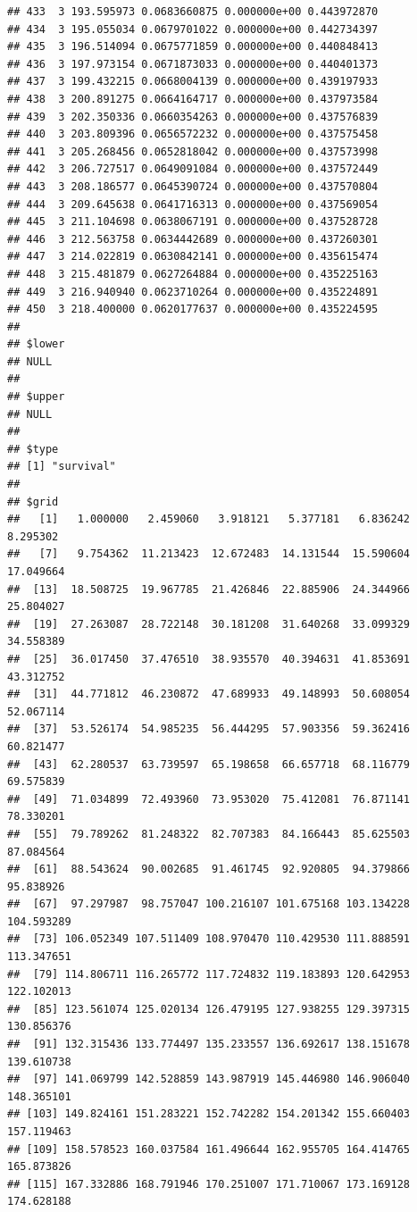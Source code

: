 \documentclass[article]{jss}\usepackage[]{graphicx}\usepackage[]{xcolor}
\makeatletter
\newenvironment{kframe}{%
 \def\at@end@of@kframe{}%
 \ifinner\ifhmode%
  \def\at@end@of@kframe{\end{minipage}}%
  \begin{minipage}{\columnwidth}%
 \fi\fi%
 \def\FrameCommand##1{\hskip\@totalleftmargin \hskip-\fboxsep
 \colorbox{shadecolor}{##1}\hskip-\fboxsep
     \hskip-\linewidth \hskip-\@totalleftmargin \hskip\columnwidth}%
 \MakeFramed {\advance\hsize-\width
   \@totalleftmargin\z@ \linewidth\hsize
   \@setminipage}}%
 {\par\unskip\endMakeFramed%
 \at@end@of@kframe}
\newenvironment{knitrout}{}{} %
\makeatother
\begin{document}
\begin{knitrout}
\begin{kframe}
\begin{verbatim}
## 433  3 193.595973 0.0683660875 0.000000e+00 0.443972870
## 434  3 195.055034 0.0679701022 0.000000e+00 0.442734397
## 435  3 196.514094 0.0675771859 0.000000e+00 0.440848413
## 436  3 197.973154 0.0671873033 0.000000e+00 0.440401373
## 437  3 199.432215 0.0668004139 0.000000e+00 0.439197933
## 438  3 200.891275 0.0664164717 0.000000e+00 0.437973584
## 439  3 202.350336 0.0660354263 0.000000e+00 0.437576839
## 440  3 203.809396 0.0656572232 0.000000e+00 0.437575458
## 441  3 205.268456 0.0652818042 0.000000e+00 0.437573998
## 442  3 206.727517 0.0649091084 0.000000e+00 0.437572449
## 443  3 208.186577 0.0645390724 0.000000e+00 0.437570804
## 444  3 209.645638 0.0641716313 0.000000e+00 0.437569054
## 445  3 211.104698 0.0638067191 0.000000e+00 0.437528728
## 446  3 212.563758 0.0634442689 0.000000e+00 0.437260301
## 447  3 214.022819 0.0630842141 0.000000e+00 0.435615474
## 448  3 215.481879 0.0627264884 0.000000e+00 0.435225163
## 449  3 216.940940 0.0623710264 0.000000e+00 0.435224891
## 450  3 218.400000 0.0620177637 0.000000e+00 0.435224595
## 
## $lower
## NULL
## 
## $upper
## NULL
## 
## $type
## [1] "survival"
## 
## $grid
##   [1]   1.000000   2.459060   3.918121   5.377181   6.836242   8.295302
##   [7]   9.754362  11.213423  12.672483  14.131544  15.590604  17.049664
##  [13]  18.508725  19.967785  21.426846  22.885906  24.344966  25.804027
##  [19]  27.263087  28.722148  30.181208  31.640268  33.099329  34.558389
##  [25]  36.017450  37.476510  38.935570  40.394631  41.853691  43.312752
##  [31]  44.771812  46.230872  47.689933  49.148993  50.608054  52.067114
##  [37]  53.526174  54.985235  56.444295  57.903356  59.362416  60.821477
##  [43]  62.280537  63.739597  65.198658  66.657718  68.116779  69.575839
##  [49]  71.034899  72.493960  73.953020  75.412081  76.871141  78.330201
##  [55]  79.789262  81.248322  82.707383  84.166443  85.625503  87.084564
##  [61]  88.543624  90.002685  91.461745  92.920805  94.379866  95.838926
##  [67]  97.297987  98.757047 100.216107 101.675168 103.134228 104.593289
##  [73] 106.052349 107.511409 108.970470 110.429530 111.888591 113.347651
##  [79] 114.806711 116.265772 117.724832 119.183893 120.642953 122.102013
##  [85] 123.561074 125.020134 126.479195 127.938255 129.397315 130.856376
##  [91] 132.315436 133.774497 135.233557 136.692617 138.151678 139.610738
##  [97] 141.069799 142.528859 143.987919 145.446980 146.906040 148.365101
## [103] 149.824161 151.283221 152.742282 154.201342 155.660403 157.119463
## [109] 158.578523 160.037584 161.496644 162.955705 164.414765 165.873826
## [115] 167.332886 168.791946 170.251007 171.710067 173.169128 174.628188

\end{verbatim}
\end{kframe}
\end{knitrout}
\end{document}
